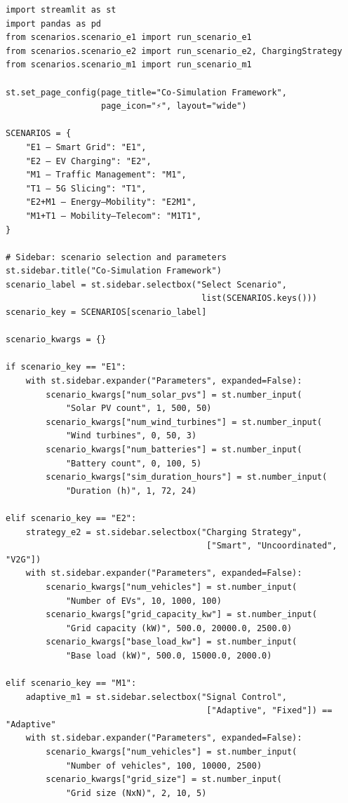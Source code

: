 \begin{listing}[H]
\begin{verbatim}
import streamlit as st
import pandas as pd
from scenarios.scenario_e1 import run_scenario_e1
from scenarios.scenario_e2 import run_scenario_e2, ChargingStrategy
from scenarios.scenario_m1 import run_scenario_m1

st.set_page_config(page_title="Co-Simulation Framework",
                   page_icon="⚡", layout="wide")

SCENARIOS = {
    "E1 – Smart Grid": "E1",
    "E2 – EV Charging": "E2",
    "M1 – Traffic Management": "M1",
    "T1 – 5G Slicing": "T1",
    "E2+M1 – Energy–Mobility": "E2M1",
    "M1+T1 – Mobility–Telecom": "M1T1",
}

# Sidebar: scenario selection and parameters
st.sidebar.title("Co-Simulation Framework")
scenario_label = st.sidebar.selectbox("Select Scenario",
                                       list(SCENARIOS.keys()))
scenario_key = SCENARIOS[scenario_label]

scenario_kwargs = {}

if scenario_key == "E1":
    with st.sidebar.expander("Parameters", expanded=False):
        scenario_kwargs["num_solar_pvs"] = st.number_input(
            "Solar PV count", 1, 500, 50)
        scenario_kwargs["num_wind_turbines"] = st.number_input(
            "Wind turbines", 0, 50, 3)
        scenario_kwargs["num_batteries"] = st.number_input(
            "Battery count", 0, 100, 5)
        scenario_kwargs["sim_duration_hours"] = st.number_input(
            "Duration (h)", 1, 72, 24)

elif scenario_key == "E2":
    strategy_e2 = st.sidebar.selectbox("Charging Strategy",
                                        ["Smart", "Uncoordinated", "V2G"])
    with st.sidebar.expander("Parameters", expanded=False):
        scenario_kwargs["num_vehicles"] = st.number_input(
            "Number of EVs", 10, 1000, 100)
        scenario_kwargs["grid_capacity_kw"] = st.number_input(
            "Grid capacity (kW)", 500.0, 20000.0, 2500.0)
        scenario_kwargs["base_load_kw"] = st.number_input(
            "Base load (kW)", 500.0, 15000.0, 2000.0)

elif scenario_key == "M1":
    adaptive_m1 = st.sidebar.selectbox("Signal Control",
                                        ["Adaptive", "Fixed"]) == "Adaptive"
    with st.sidebar.expander("Parameters", expanded=False):
        scenario_kwargs["num_vehicles"] = st.number_input(
            "Number of vehicles", 100, 10000, 2500)
        scenario_kwargs["grid_size"] = st.number_input(
            "Grid size (NxN)", 2, 10, 5)


\end{verbatim}
\end{listing}
